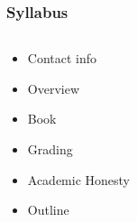 \documentclass[color=usenames,dvipsnames]{beamer}
\begin{document}
\begin{frame}
  \frametitle{Syllabus}
  \begin{columns}%
    \begin{column}{0.5\textwidth}
      \Large %
      \begin{itemize}
      \item Contact info
      \item Overview
      \item Book
      \item Grading
      \item Academic Honesty
      \item Outline
      \end{itemize}
    \end{column}
    \begin{column}{0.5\textwidth}
%      
    \end{column}
  \end{columns}
\end{frame}
\end{document}
